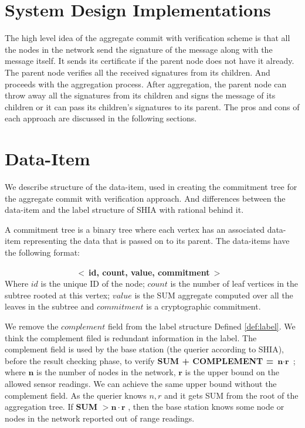 \section{System Design Implementations}
	The high level idea of the aggregate commit with verification scheme is that all the nodes in the network send the signature of the message along with the message itself. 
	It sends its certificate if the parent node does not have it already.
	The parent node verifies all the received signatures from its children.
	And proceeds with the aggregation process.
	After aggregation, the parent node can throw away all the signatures from its children and signs the message of its children or it can pass its children's signatures to its parent. 
	The pros and cons of each approach are discussed in the following sections. 

\section{Data-Item}
	
	We describe structure of the data-item, used in creating the commitment tree for the aggregate commit with verification approach. And differences between the data-item and the label structure of SHIA with rational behind it.
	\begin{definition}
		\label{def:data-item}
		A commitment tree is a binary tree where each vertex has an associated data-item representing the data that is passed on to its parent. The data-items have the following format:

		$\hspace{100pt}$ \textbf{$<\ $id, count, value, commitment$\ >$}\\
	Where $id$ is the unique ID of the node; $count$ is the number of leaf vertices in the subtree rooted at this vertex; $value$ is the SUM aggregate computed over all the leaves in the subtree and $commitment$ is a cryptographic commitment.
	\end{definition}
	
	We remove the $complement$ field from the label structure Defined \ref{def:label}. 
	We think the complement filed is redundant information in the label. 
	The complement field is used by the base station (the querier according to SHIA), before the result checking phase, to verify \textbf{SUM + COMPLEMENT =} $\textbf{n} \cdot \textbf{r}$ ; where $\textbf{n}$ is the number of nodes in the network, $\textbf{r}$ is the upper bound on the allowed sensor readings.
	We can achieve the same upper bound without the complement field.
	As the querier knows $n, r$ and it gets SUM from the root of the aggregation tree.
	If \textbf{SUM} $> \textbf{n} \cdot \textbf{r}$ , then the base station knows some node or nodes in the network reported out of range readings.

